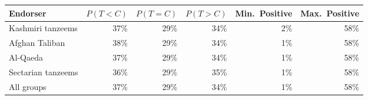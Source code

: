 \begin{tabular}{lrrrrr}
\toprule
Endorser & $P(T<C)$ & $P(T=C)$ & $P(T>C)$ & Min.\ Positive & Max.\ Positive \\
\midrule
Kashmiri tanzeems & 37\% & 29\% & 34\% & 2\% & 58\% \\
Afghan Taliban & 38\% & 29\% & 34\% & 1\% & 58\% \\
Al-Qaeda & 37\% & 29\% & 34\% & 1\% & 58\% \\
Sectarian tanzeems & 36\% & 29\% & 35\% & 1\% & 58\% \\
\midrule
All groups & 37\% & 29\% & 34\% & 1\% & 58\% \\
\bottomrule
\end{tabular}
